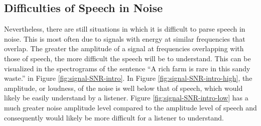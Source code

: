 \subsection{Difficulties of Speech in Noise}

Nevertheless, there are still situations in which it is difficult to parse speech in noise.  This is most often due to signals with energy at similar frequencies that overlap.  The greater the amplitude of a signal at frequencies overlapping with those of speech, the more difficult the speech will be to understand.  This can be visualized in the spectrograms of the sentence ``A rich farm is rare in this sandy waste.'' in Figure \ref{fig:signal-SNR-intro}.  In Figure \ref{fig:signal-SNR-intro-high}, the amplitude, or loudness, of the noise is well below that of speech, which would likely be easily understand by a listener.  Figure \ref{fig:signal-SNR-intro-low} has a much greater noise amplitude level compared to the amplitude level of speech and consequently would likely be more difficult for a listener to understand.

